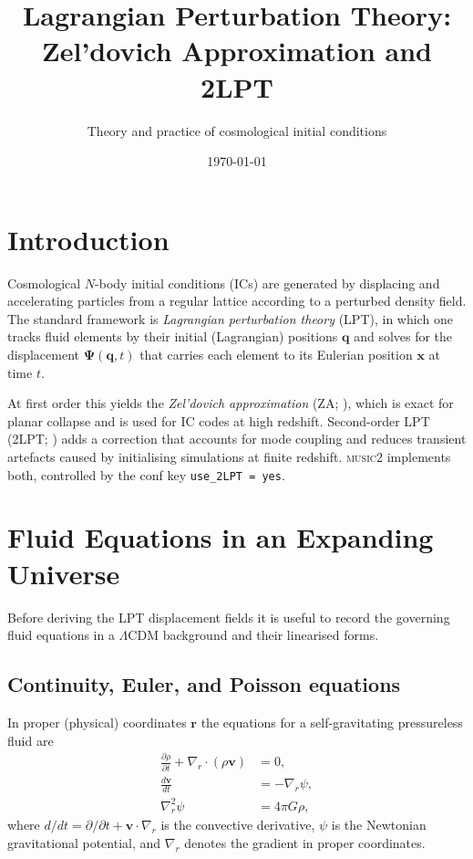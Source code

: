 \documentclass[12pt]{article}
\title{Lagrangian Perturbation Theory: Zel'dovich Approximation and 2LPT}
\author{Theory and practice of cosmological initial conditions}
\date{\today}
\newcommand{\bq}{\mathbf{q}}
\newcommand{\bx}{\mathbf{x}}
\newcommand{\bPsi}{\boldsymbol{\Psi}}
\newcommand{\bv}{\mathbf{v}}
\begin{document}
\maketitle
\tableofcontents
\newpage

\section{Introduction}

Cosmological $N$-body initial conditions (ICs) are generated by
displacing and accelerating particles from a regular lattice according
to a perturbed density field.  The standard framework is
\emph{Lagrangian perturbation theory} (LPT), in which one tracks
fluid elements by their initial (Lagrangian) positions $\bq$ and
solves for the displacement $\bPsi(\bq, t)$ that carries each element
to its Eulerian position $\bx$ at time $t$.

At first order this yields the \emph{Zel'dovich approximation} (ZA;
\citealt{Zeldovich1970}), which is exact for planar collapse and is
used for IC codes at high redshift.  Second-order LPT (2LPT;
\citealt{Buchert1993,Bouchet1995,Crocce2006}) adds a correction that
accounts for mode coupling and reduces transient artefacts caused by
initialising simulations at finite redshift.  \textsc{music2}
\citep{Hahn2011} implements both, controlled by the conf key
\texttt{use\_2LPT = yes}.

\section{Fluid Equations in an Expanding Universe}
\label{sec:fluid}

Before deriving the LPT displacement fields it is useful to record the
governing fluid equations in a $\Lambda$CDM background and their
linearised forms.

\subsection{Continuity, Euler, and Poisson equations}

In proper (physical) coordinates $\mathbf{r}$ the equations for a
self-gravitating pressureless fluid are
%
\begin{align}
  \frac{\partial\rho}{\partial t}
    + \nabla_r\cdot(\rho\bv) &= 0,
  \label{eq:continuity_proper}\\
  \frac{d\bv}{dt} &= -\nabla_r\psi,
  \label{eq:euler_proper}\\
  \nabla_r^2\psi &= 4\pi G\rho,
  \label{eq:poisson_proper}
\end{align}
%
where $d/dt = \partial/\partial t + \bv\cdot\nabla_r$ is the
convective derivative, $\psi$ is the Newtonian gravitational potential,
and $\nabla_r$ denotes the gradient in proper coordinates.
\end{document}
